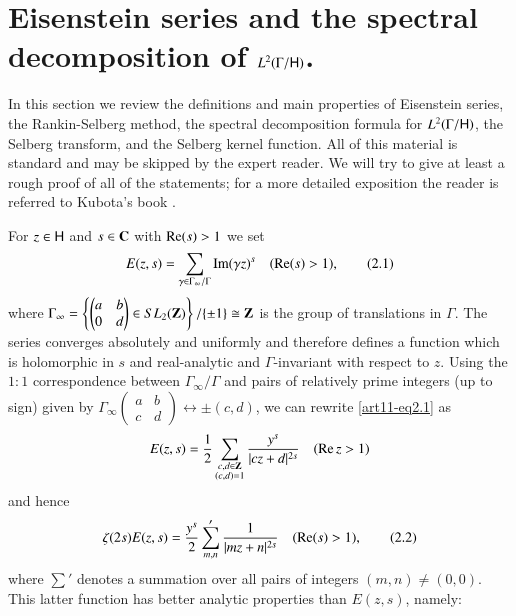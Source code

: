 \section{Eisenstein series and the spectral decomposition of $L^2 (\Gamma / \mathsf{H})$.}\label{art11-sec2}
In this section we review the definitions and main properties of Eisenstein series, the Rankin-Selberg method, the spectral decomposition formula for $L^2 (\Gamma / \mathsf{H})$, the Selberg transform, and the Selberg kernel function. All of this material is standard and may be skipped by the expert reader. We will try to give at least a rough proof of all of the statements; for a more detailed exposition the reader is referred to Kubota's book \cite{art11-4}.

\medskip
\noindent
{}
For $z \in \mathsf{H}$ and $s \in \mathbf{C}$ with $\operatorname{Re} (s) >1$ we set
\begin{equation*}
E(z,s ) = \sum\limits_{ \gamma \in \Gamma_\infty/ \Gamma} \operatorname{Im} (\gamma z)^s \quad (\operatorname{Re} (s) >1), \tag{2.1}\label{art11-eq2.1}
\end{equation*}
where $\Gamma_\infty = \left\{ \left(\begin{matrix}
a & b \\
0 &d
\end{matrix}
\right) \in SL_2(\mathbf{Z}) \right\} / \{\pm 1\} \cong\mathbf{Z}$ is the group of translations in $\Gamma$. The series converges absolutely and uniformly and therefore defines a function which is holomorphic in $s$ and real-analytic and $\Gamma$-invariant with respect to $z$. Using the $1:1$ correspondence between $\Gamma_\infty/ \Gamma$ and pairs of relatively prime integers (up to sign) given by $\Gamma_\infty \left(\begin{matrix}
a & b \\ c & d
\end{matrix}\right) \longleftrightarrow \pm (c,d)$, we can rewrite \eqref{art11-eq2.1} as 
$$
E(z, s) = \frac{1}{2} \sum\limits_{\substack{c , d \in \mathbf{Z}\\ (c,d) =1}} \frac{y^s}{|cz+d|^{2s}} \quad (\operatorname{Re} z > 1)
$$
and hence 
\begin{equation*}
\zeta(2s) E (z,s) =\frac{y^s}{2} \sum\limits'_{m,n} \frac{1}{|mz+n|^{2s}} \quad  (\operatorname{Re} (s) >1), \tag{2.2}\label{art11-eq2.2}
\end{equation*}
where $\sum'$ denotes a summation over all pairs of integers $(m,n) \neq (0,0)$. This latter function has better analytic properties than $E(z,s)$, namely:

